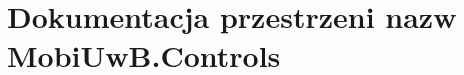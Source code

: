\hypertarget{a00267}{}\section{Dokumentacja przestrzeni nazw Mobi\+Uw\+B.\+Controls}
\label{a00267}
